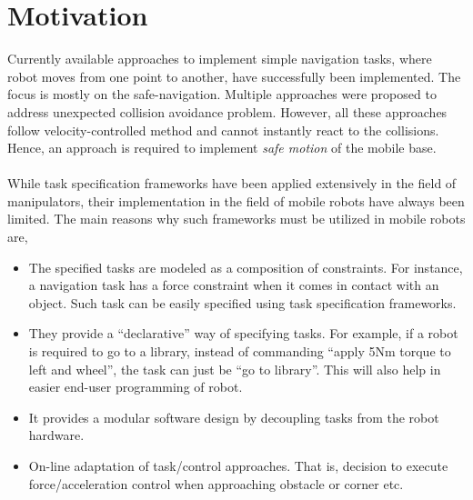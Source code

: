 

\section{Motivation}
Currently available approaches to implement simple navigation tasks, where robot moves from one point to another, have successfully been implemented. The focus is mostly on the safe-navigation. Multiple approaches were proposed to address unexpected collision avoidance problem. However, all these approaches follow velocity-controlled method and cannot instantly react to the collisions. Hence, an approach is required to implement \textit{safe motion} of the mobile base. 

\paragraph{}While task specification frameworks have been applied extensively in the field of manipulators, their implementation in the field of mobile robots have always been limited. The main reasons why such frameworks must be utilized in mobile robots are,
\begin{itemize}
	\item The specified tasks are modeled as a composition of constraints. For instance, a navigation task has a force constraint when it comes in contact with an object. Such task can be easily specified using task specification frameworks.
	\item They provide a ``declarative'' way of specifying tasks. For example, if a robot is required to go to a library, instead of commanding ``apply 5Nm torque to left and wheel'', the task can just be ``go to library''. This will also help in easier end-user programming of robot.
	\item It provides a modular software design by decoupling tasks from the robot hardware.
	\item On-line adaptation of task/control approaches. That is, decision to execute force/acceleration control when approaching obstacle or corner etc.
\end{itemize}





